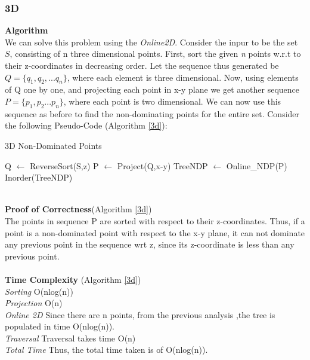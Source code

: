 \documentclass{article}
\begin{document}
\subsubsection{3D}
\textbf{Algorithm}\\
We can solve this problem using the \emph{Online2D}. Consider the inpur to be the set $S$, consisting of n three dimensional points. First, sort the given \emph{n} points w.r.t to their z-coordinates in decreasing order. Let the sequence thus generated be $Q = \{q_1,q_2,... q_n\}$, where each element is three dimensional. Now, using elements of Q one by one, and projecting each point in x-y plane we get another sequence $P= \{p_1,p_2... p_n\}$, where each point is two dimensional. We can now use this sequence as before to find the non-dominating points for the entire set. Consider the following Pseudo-Code (Algorithm \ref{3d}):\\
\begin{algorithm}
\caption{3D Non-Dominated Points}
\label{3d}
\begin{algorithmic}[1]
\State Q $\gets$ ReverseSort(S,z)  
\State P $\gets$ Project(Q,x-y)  
\State TreeNDP $\gets$ Online\_NDP(P)   
\State Inorder(TreeNDP)   
\EndProcedure
\end{algorithmic}
\end{algorithm}
\\
\textbf{Proof of Correctness}(Algorithm \ref{3d})\\
The points in sequence P are sorted with respect to their z-coordinates. Thus, if a point is a non-dominated point with respect to the x-y plane, it can not dominate any previous point in the sequence wrt z, since its z-coordinate is less than any previous point.\\ \\
\textbf{Time Complexity} (Algorithm \ref{3d})\\
\emph{Sorting} O(nlog(n))\\
\emph{Projection} O(n)\\
\emph{Online 2D} Since there are n points, from the previous analysis ,the tree is populated in time O(nlog(n)).\\
\emph{Traversal} Traversal takes time O(n) \\
\emph{Total Time} Thus, the total time taken is of O(nlog(n)).
 
\end{document}
